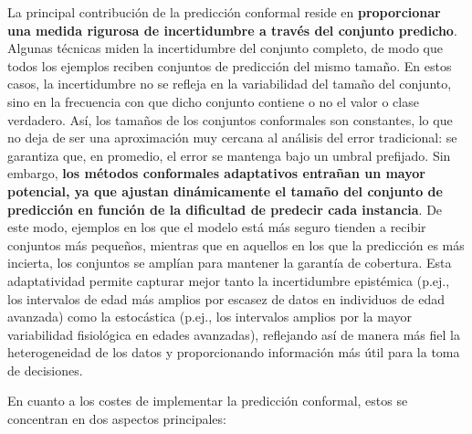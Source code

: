 
La principal contribución de la predicción conformal reside en \textbf{proporcionar una medida rigurosa de incertidumbre a través del conjunto predicho}. Algunas técnicas miden la incertidumbre del conjunto completo, de modo que todos los ejemplos reciben conjuntos de predicción del mismo tamaño. En estos casos, la incertidumbre no se refleja en la variabilidad del tamaño del conjunto, sino en la frecuencia con que dicho conjunto contiene o no el valor o clase verdadero. Así, los tamaños de los conjuntos conformales son constantes, lo que no deja de ser una aproximación muy cercana al análisis del error tradicional: se garantiza que, en promedio, el error se mantenga bajo un umbral prefijado.
Sin embargo, \textbf{los métodos conformales adaptativos entrañan un mayor potencial, ya que ajustan dinámicamente el tamaño del conjunto de predicción en función de la dificultad de predecir cada instancia}. De este modo, ejemplos en los que el modelo está más seguro tienden a recibir conjuntos más pequeños, mientras que en aquellos en los que la predicción es más incierta, los conjuntos se amplían para mantener la garantía de cobertura. 
Esta adaptatividad permite capturar mejor tanto la incertidumbre epistémica (p.ej., los intervalos de edad más amplios por escasez de datos en individuos de edad avanzada) como la estocástica (p.ej., los intervalos amplios por la mayor variabilidad fisiológica en edades avanzadas), reflejando así de manera más fiel la heterogeneidad de los datos y proporcionando información más útil para la toma de decisiones.



En cuanto a los costes de implementar la predicción conformal, estos se concentran en dos aspectos principales:

